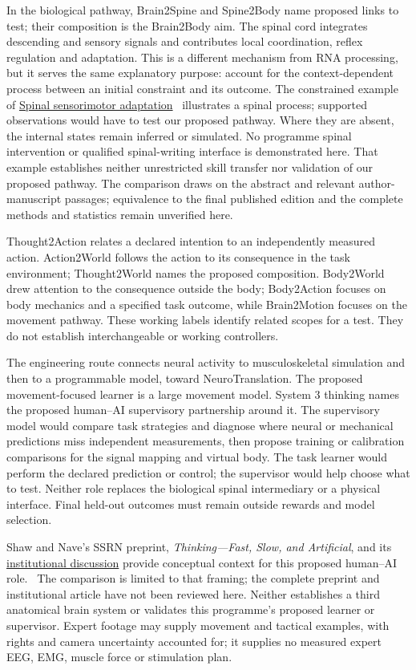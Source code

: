 In the biological pathway, Brain2Spine and Spine2Body name proposed links to
test; their composition is the Brain2Body aim. The spinal cord integrates
descending and sensory signals and contributes local coordination, reflex
regulation and adaptation. This is a different mechanism from RNA processing,
but it serves the same explanatory purpose: account for the context-dependent
process between an initial constraint and its outcome. The constrained example of
\href{https://pubmed.ncbi.nlm.nih.gov/38603479/}{Spinal sensorimotor adaptation}~\cite{lavaud2024}
illustrates a spinal process; supported observations would have to test our proposed pathway. Where they are absent, the internal
states remain inferred or simulated. No programme spinal intervention or qualified spinal-writing interface is demonstrated here.
That example establishes neither unrestricted skill transfer nor validation
of our proposed pathway. The comparison draws on the abstract and
relevant author-manuscript passages; equivalence to the final published edition
and the complete methods and statistics remain unverified here.

Thought2Action relates a declared intention to an independently measured action.
Action2World follows the action to its consequence in the task environment;
Thought2World names the proposed composition. Body2World drew attention to the
consequence outside the body; Body2Action focuses on body mechanics and a
specified task outcome, while Brain2Motion focuses on the movement pathway.
These working labels identify related scopes for a test. They do not establish
interchangeable or working controllers.

The engineering route connects neural activity to musculoskeletal simulation
and then to a programmable model, toward NeuroTranslation. The proposed
movement-focused learner is a large movement model. System 3 thinking names
the proposed human--AI supervisory partnership around it. The supervisory
model would compare task strategies and diagnose where neural or mechanical
predictions miss independent measurements, then propose training or calibration
comparisons for the signal mapping and virtual body. The task learner would
perform the declared prediction or control; the supervisor would help choose
what to test. Neither role replaces the biological spinal intermediary or a
physical interface. Final held-out outcomes must remain outside rewards and
model selection.
\par\noindent Shaw and Nave's SSRN preprint,
\emph{Thinking---Fast, Slow, and Artificial}, and its
\href{https://executiveeducation.wharton.upenn.edu/thought-leadership/wharton-at-work/2026/05/thinking-fast-slow-and-artificially/}{institutional discussion}
provide conceptual context for this proposed human--AI role.~\cite{shawNaveSystem3Retained}
The comparison is limited to that framing; the complete preprint and institutional
article have not been reviewed here. Neither establishes a third anatomical brain
system or validates this programme's proposed learner or supervisor. Expert footage may supply
movement and tactical examples, with rights and camera uncertainty accounted
for; it supplies no measured expert EEG, EMG, muscle force or stimulation plan.

